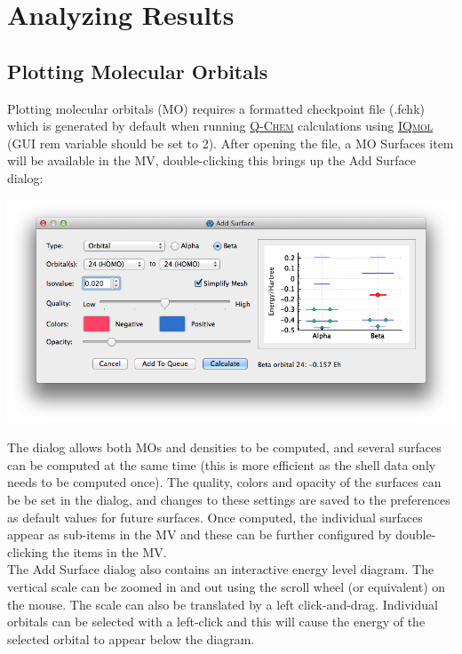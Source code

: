 \documentclass[a4paper,12pt]{article}
\newcommand{\qchem}{\href{http://q-chem.com}{{\scshape Q-Chem}}}
\newcommand{\iqmol}{\href{http://iqmol.org}{{\scshape IQmol}}}
\begin{document}
\newpage
\section{Analyzing Results}

\subsection{Plotting Molecular Orbitals}
Plotting molecular orbitals (MO) requires a formatted checkpoint file (.fchk)
which is generated by default when running \qchem{} calculations using \iqmol{}
(GUI rem variable should be set to 2).  After opening the file, a MO Surfaces
item will be available in the MV, double-clicking this brings up the Add Surface
dialog:
\begin{center}
\includegraphics[scale=0.5]{figures/MolecularOrbitalsConfigurator.png} \\
\end{center}
The dialog allows both MOs and densities to be computed, and several surfaces
can be computed at the same time (this is more efficient as the shell data
only needs to be computed once).  The quality, colors and opacity of the
surfaces can be be set in the dialog, and changes to these settings are saved
to the preferences as default values for future surfaces.  Once computed, the
individual surfaces appear as sub-items in the MV and these can be further
configured by double-clicking the items in the MV.  \\

The Add Surface dialog also contains an interactive energy level diagram.  The
vertical scale can be zoomed in and out using the scroll wheel (or equivalent)
on the mouse.  The scale can also be translated by a left click-and-drag.
Individual orbitals can be selected with a left-click and this will cause the
energy of the selected orbital to appear below the diagram. \\
\end{document}

